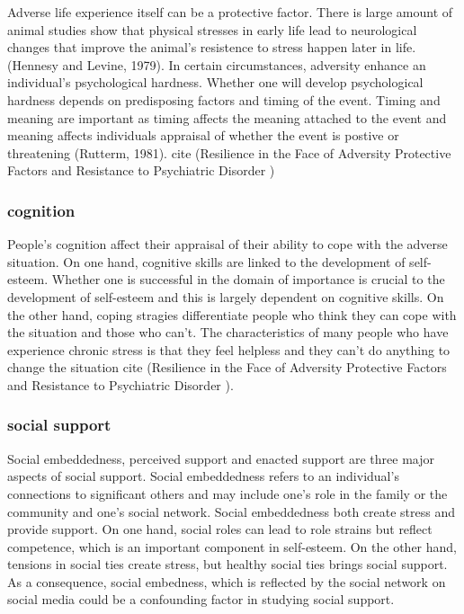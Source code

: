 Adverse life experience itself can be a protective factor. There is large amount of animal studies show that physical stresses in early life lead to neurological changes that improve the animal's resistence to stress happen later in life. (Hennesy and Levine, 1979). In certain circumstances, adversity enhance an individual's psychological hardness. Whether one will develop psychological hardness depends on predisposing factors and timing of the event. Timing and meaning are important as timing affects the meaning attached to the event and meaning affects individuals appraisal of whether the event is postive or threatening (Rutterm, 1981). cite (Resilience in the Face of Adversity Protective Factors and Resistance to Psychiatric Disorder )

\subsubsection{cognition}
People's cognition affect their appraisal of their ability to cope with the adverse situation. On one hand, cognitive skills are linked to the development of self-esteem. Whether one is successful in the domain of importance is crucial to the development of self-esteem and this is largely dependent on cognitive skills. On the other hand, coping stragies differentiate people who think they can cope with the situation and those who can't. The characteristics of many people who have experience chronic stress is that they feel helpless and they can't do anything to change the situation cite (Resilience in the Face of Adversity Protective Factors and Resistance to Psychiatric Disorder ). 


\subsubsection{social support}

Social embeddedness, perceived support and enacted support are three major aspects of social support. 
Social embeddedness refers to an individual's connections to significant others and may include one's role in the family or the community and one's social network. Social embeddedness both create stress and provide support. On one hand, social roles can lead to role strains but reflect competence, which is an important component in self-esteem. On the other hand, tensions in social ties create stress, but healthy social ties brings social support. As a consequence, social embedness, which is reflected by the social network on social media could be a confounding factor in studying social support. 

